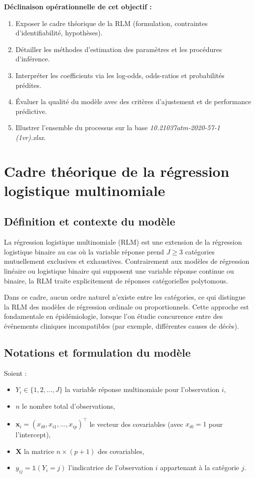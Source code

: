 \documentclass[12pt,a4paper]{article}
\begin{document}
\textbf{Déclinaison opérationnelle de cet objectif :}
\begin{enumerate}[label=\arabic*.]
    \item Exposer le cadre théorique de la RLM (formulation, contraintes d'identifiabilité, hypothèses).
    \item Détailler les méthodes d'estimation des paramètres et les procédures d'inférence.
    \item Interpréter les coefficients via les log-odds, odds-ratios et probabilités prédites.
    \item Évaluer la qualité du modèle avec des critères d'ajustement et de performance prédictive.
    \item Illustrer l'ensemble du processus sur la base \textit{10.21037atm-2020-57-1 (1vr).xlsx}.
\end{enumerate}

\section{Cadre théorique de la régression logistique multinomiale}

\subsection{Définition et contexte du modèle}

La régression logistique multinomiale (RLM) est une extension de la régression logistique binaire au cas où la variable réponse prend $J\geq 3$ catégories mutuellement exclusives et exhaustives. Contrairement aux modèles de régression linéaire ou logistique binaire qui supposent une variable réponse continue ou binaire, la RLM traite explicitement de réponses catégorielles polytomous.

Dans ce cadre, aucun ordre naturel n'existe entre les catégories, ce qui distingue la RLM des modèles de régression ordinale ou proportionnels. Cette approche est fondamentale en épidémiologie, lorsque l'on étudie concurrence entre des événements cliniques incompatibles (par exemple, différentes causes de décès).

\subsection{Notations et formulation du modèle}

Soient :
\begin{itemize}
    \item $Y_i \in \{1,2,\dots,J\}$ la variable réponse multinomiale pour l'observation $i$,
    \item $n$ le nombre total d'observations,
    \item $\mathbf{x}_i=(x_{i0}, x_{i1},\dots,x_{ip})^\top$ le vecteur des covariables (avec $x_{i0}=1$ pour l'intercept),
    \item $\mathbf{X}$ la matrice $n \times (p+1)$ des covariables,
    \item $y_{ij}=\mathbb{1}(Y_i=j)$ l'indicatrice de l'observation $i$ appartenant à la catégorie $j$.
\end{itemize}
\end{document}
